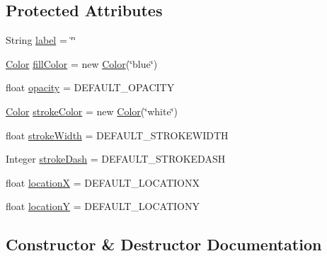 \subsection*{Protected Attributes}
\begin{DoxyCompactItemize}
\item 
String \mbox{\hyperlink{classbridges_1_1base_1_1_symbol_ad2adcc82e6a96c2f3c465702502655e9}{label}} = \char`\"{}\char`\"{}
\item 
\mbox{\hyperlink{classbridges_1_1base_1_1_color}{Color}} \mbox{\hyperlink{classbridges_1_1base_1_1_symbol_a44f00712b6c584c7778ed9de4c394cbf}{fill\+Color}} = new \mbox{\hyperlink{classbridges_1_1base_1_1_color}{Color}}(\char`\"{}blue\char`\"{})
\item 
float \mbox{\hyperlink{classbridges_1_1base_1_1_symbol_a92f497d2e6363f20a65f36777846c8e5}{opacity}} = D\+E\+F\+A\+U\+L\+T\+\_\+\+O\+P\+A\+C\+I\+TY
\item 
\mbox{\hyperlink{classbridges_1_1base_1_1_color}{Color}} \mbox{\hyperlink{classbridges_1_1base_1_1_symbol_a51a9a36983b00156284d86ca80cccfb0}{stroke\+Color}} = new \mbox{\hyperlink{classbridges_1_1base_1_1_color}{Color}}(\char`\"{}white\char`\"{})
\item 
float \mbox{\hyperlink{classbridges_1_1base_1_1_symbol_af00affe40d45a600e3b8c79fce6c9505}{stroke\+Width}} = D\+E\+F\+A\+U\+L\+T\+\_\+\+S\+T\+R\+O\+K\+E\+W\+I\+D\+TH
\item 
Integer \mbox{\hyperlink{classbridges_1_1base_1_1_symbol_a04134e835474c4747e334389f00513c0}{stroke\+Dash}} = D\+E\+F\+A\+U\+L\+T\+\_\+\+S\+T\+R\+O\+K\+E\+D\+A\+SH
\item 
float \mbox{\hyperlink{classbridges_1_1base_1_1_symbol_a0765e86b476d2309d0da02e12b0fc4c9}{locationX}} = D\+E\+F\+A\+U\+L\+T\+\_\+\+L\+O\+C\+A\+T\+I\+O\+NX
\item 
float \mbox{\hyperlink{classbridges_1_1base_1_1_symbol_adfb7811be513e5cd0f37a783062e0109}{locationY}} = D\+E\+F\+A\+U\+L\+T\+\_\+\+L\+O\+C\+A\+T\+I\+O\+NY
\end{DoxyCompactItemize}


\subsection{Constructor \& Destructor Documentation}
\mbox{\label{classbridges_1_1base_1_1_symbol_a5449cffb7ffdbab093a110957158acc6}} 
